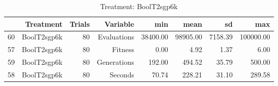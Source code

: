 \begin{table}[ht]
\centering
\begin{tabular}{rrrrrrrr}
  \hline
 & Treatment & Trials & Variable & min & mean & sd & max \\ 
  \hline
60 & BoolT2sgp6k &  80 & Evaluations & 38400.00 & 98905.00 & 7158.39 & 100000.00 \\ 
  57 & BoolT2sgp6k &  80 & Fitness & 0.00 & 4.92 & 1.37 & 6.00 \\ 
  59 & BoolT2sgp6k &  80 & Generations & 192.00 & 494.52 & 35.79 & 500.00 \\ 
  58 & BoolT2sgp6k &  80 & Seconds & 70.74 & 228.21 & 31.10 & 289.58 \\ 
   \hline
\end{tabular}
\caption{Treatment: BoolT2sgp6k} 
\end{table}
